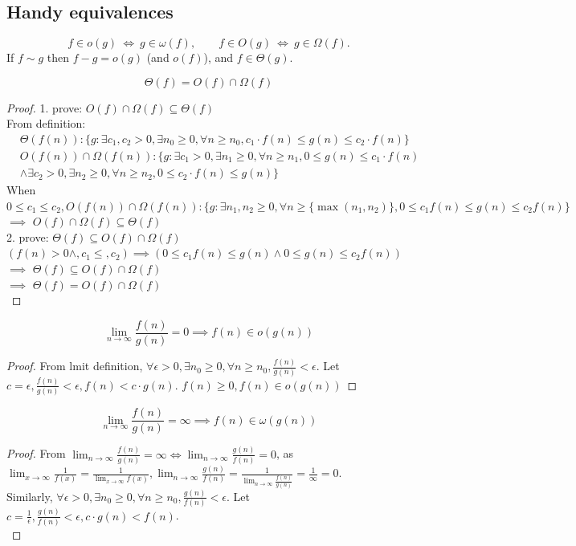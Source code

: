 \documentclass[9pt]{extarticle}
\begin{document}
\subsection*{Handy equivalences}
\[
f\in o(g)\ \Longleftrightarrow\ g\in \omega(f),\qquad
f\in O(g)\ \Longleftrightarrow\ g\in \Omega(f).
\]
If $f\sim g$ then $f-g=o(g)$ (and $o(f)$), and $f\in\Theta(g)$.

\[\Theta(f) = O(f) \cap \Omega(f)\]
\begin{proof}
    1. prove: $O(f) \cap \Omega(f) \subseteq \Theta(f) $\\  
    From definition: \\
    \begin{align*}
        &\Theta(f(n)): \{g: \exists c_1, c_2 > 0, \exists n_0 \geq 0, \forall n \geq n_0, c_1 \cdot f(n) \leq g(n) \leq c_2 \cdot f(n)\}\\
        &O(f(n)) \cap \Omega(f(n)): \{g: \exists c_1 > 0, \exists n_1 \geq 0, \forall n \geq n_1, 0 \leq g(n) \leq c_1 \cdot f(n)\\ &\land 
        \exists c_2 > 0, \exists n_2 \geq 0, \forall n \geq n_2, 0 \leq c_2 \cdot f(n) \leq g(n)\}
    \end{align*}
    When $0 \leq c_1 \leq c_2, O(f(n)) \cap \Omega(f(n)): 
    \{g: \exists n_1, n_2 \geq 0, \forall n \geq \{\max(n_1, n_2)\}, 0 \leq c_1 f(n) \leq g(n) \leq c_2 f(n)\}$\\
    $\implies $ $O(f) \cap \Omega(f) \subseteq \Theta(f) $\\  
    2. prove: $\Theta(f) \subseteq O(f) \cap \Omega(f)$\\ 
    $(f(n) > 0 \land, c_1 \leq, c_2) \implies (0 \leq c_1 f(n) \leq g(n) \land 0 \leq g(n) \leq c_2 f(n))$\\ 
    $\implies $  $\Theta(f) \subseteq O(f) \cap \Omega(f)$\\ 
    $\implies $  $\Theta(f) = O(f) \cap \Omega(f)$\\ 


\end{proof}
\[\lim_{n \rightarrow \infty} \frac{f(n)}{g(n)} = 0 \implies f(n) \in o(g(n))\]
\begin{proof}
    From lmit definition, $\forall \epsilon > 0, \exists n_0 \geq 0, 
    \forall n \geq n_0, \frac{f(n)}{g(n)} < \epsilon$. Let $c = \epsilon, 
    \frac{f(n)}{g(n)} < \epsilon, f(n) < c \cdot g(n)$. $f(n) \geq 0, f(n) \in o(g(n))$
\end{proof}
\[\lim_{n \rightarrow \infty} \frac{f(n)}{g(n)} = \infty \implies f(n) \in \omega(g(n))\]
\begin{proof}
    From $\lim_{n \rightarrow \infty} \frac{f(n)}{g(n)} = \infty \iff \lim_{n \rightarrow \infty} \frac{g(n)}{f(n)} = 0$, as \\
    $\lim_{x \rightarrow \infty} \frac{1}{f(x)} = \frac{1}{\lim_{x\to\infty} f(x)}, \lim_{n \rightarrow \infty} \frac{g(n)}{f(n)} = \frac{1}{\lim_{n \rightarrow \infty}\frac{f(n)}{g(n)}} = \frac{1}{\infty} = 0$.\\
    Similarly, $\forall \epsilon > 0, \exists n_0 \geq 0, 
    \forall n \geq n_0, \frac{g(n)}{f(n)} < \epsilon$. Let $c = \frac{1}{\epsilon}, 
    \frac{g(n)}{f(n)} < \epsilon, c \cdot g(n) < f(n)$.\\
\end{proof}
\end{document}
